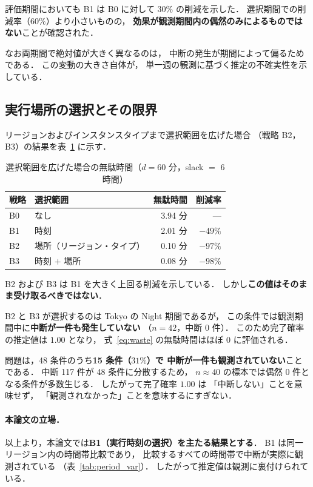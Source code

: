 \documentclass[11pt,a4paper]{ltjsreport}
\begin{document}
評価期間においても B1 は B0 に対して $30\%$ の削減を示した．
選択期間での削減率（$60\%$）より小さいものの，
\textbf{効果が観測期間内の偶然のみによるものではない}ことが確認された．

なお両期間で絶対値が大きく異なるのは，
中断の発生が期間によって偏るためである．
この変動の大きさ自体が，
単一週の観測に基づく推定の不確実性を示している．

\subsection{実行場所の選択とその限界}
\label{sec:b2_limit}

リージョンおよびインスタンスタイプまで選択範囲を広げた場合
（戦略 B2，B3）の結果を表~\ref{tab:b2_result} に示す．

\begin{table}[htbp]
\centering
\caption{選択範囲を広げた場合の無駄時間（$d = 60$ 分，slack $=$ 6 時間）}
\label{tab:b2_result}
\small
\begin{tabular}{@{}llrr@{}}
\toprule
戦略 & 選択範囲 & 無駄時間 & 削減率 \\
\midrule
B0 & なし & 3.94 分 & --- \\
B1 & 時刻 & 2.01 分 & $-49\%$ \\
B2 & 場所（リージョン・タイプ） & 0.10 分 & $-97\%$ \\
B3 & 時刻 $+$ 場所 & 0.08 分 & $-98\%$ \\
\bottomrule
\end{tabular}
\end{table}

B2 および B3 は B1 を大きく上回る削減を示している．
しかし\textbf{この値はそのまま受け取るべきではない}．

B2 と B3 が選択するのは Tokyo の Night 期間であるが，
この条件では観測期間中に\textbf{中断が一件も発生していない}
（$n = 42$，中断 0 件）．
このため完了確率の推定値は $1.00$ となり，
式~\eqref{eq:waste} の無駄時間はほぼ $0$ に評価される．

問題は，48 条件のうち\textbf{15 条件（$31\%$）で
中断が一件も観測されていない}ことである．
中断 117 件が 48 条件に分散するため，
$n \approx 40$ の標本では偶然 0 件となる条件が多数生じる．
したがって完了確率 $1.00$ は
「中断しない」ことを意味せず，
「観測されなかった」ことを意味するにすぎない．

\paragraph{本論文の立場．}
以上より，本論文では\textbf{B1（実行時刻の選択）を主たる結果とする}．
B1 は同一リージョン内の時間帯比較であり，
比較するすべての時間帯で中断が実際に観測されている
（表~\ref{tab:period_var}）．
したがって推定値は観測に裏付けられている．
\end{document}
